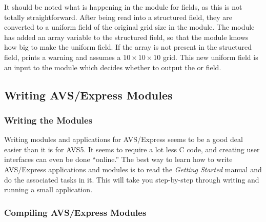 It should be noted what is happening in the  module
for  fields, as this is not totally straightforward.  After being
read into a structured field, they are converted to a uniform field of the
original grid size in the  module.  The 
module has added an  array variable to the structured field,
so that the  module knows how big to make the uniform
field.  If the  array is not present in the structured field,
 prints a warning and assumes a $10\times10\times10$
grid.  This new uniform field is an input to the  module
which decides whether to output the  or  field.


\subsection{Writing AVS/Express Modules}
\label{Writing AVS/Express Modules}


\subsubsection{Writing the Modules}
\label{Writing the Modules}

Writing modules and applications for AVS/Express seems to be a good deal
easier than it is for AVS5.  It seems to require a lot less C code, and
creating user interfaces can even be done ``online.''  The best way to learn
how to write AVS/Express applications and modules is to read the {\it Getting
Started} manual and do the associated tasks in it.  This will take you
step-by-step through writing and running a small application.


\subsubsection{Compiling AVS/Express Modules}
\label{Compiling AVS/Express Modules}

